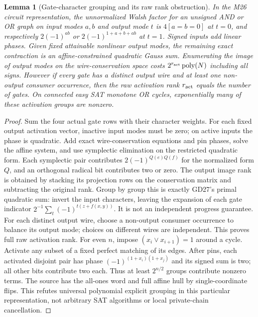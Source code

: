 \documentclass[11pt]{article}
\newtheorem{lemma}[theorem]{Lemma}
\begin{document}
\begin{lemma}[Gate-character grouping and its raw rank obstruction]\label{lem:i26-gates}
In the M26 circuit representation, the unnormalized Walsh factor for an unsigned AND or OR graph on input modes $a,b$ and output mode $t$ is $4[a=b=0]$ at $t=0$, and respectively $2(-1)^{ab}$ or $2(-1)^{1+a+b+ab}$ at $t=1$. Signed inputs add linear phases. Given fixed attainable nonlinear output modes, the remaining exact contraction is an affine-constrained quadratic Gauss sum. Enumerating the image of output modes on the wire-conservation space costs $2^{r_{\rm act}}\operatorname{poly}(N)$ including all signs. However if every gate has a distinct output wire and at least one non-output consumer occurrence, then the raw activation rank $r_{\rm act}$ equals the number of gates. On connected easy SAT monotone OR cycles, exponentially many of these activation groups are nonzero.
\end{lemma}
\begin{proof}
Sum the four actual gate rows with their character weights. For each fixed output activation vector, inactive input modes must be zero; on active inputs the phase is quadratic. Add exact wire-conservation equations and pin phases, solve the affine system, and use symplectic elimination on the restricted quadratic form. Each symplectic pair contributes $2(-1)^{Q(e)Q(f)}$ for the normalized form $Q$, and an orthogonal radical bit contributes two or zero. The output image rank is obtained by stacking its projection rows on the conservation matrix and subtracting the original rank. Group by group this is exactly GD27's primal quadratic sum: invert the input characters, leaving the expansion of each gate indicator $2^{-1}\sum_t(-1)^{t(z+f(x,y))}$. It is not an independent progress guarantee. For each distinct output wire, choose a non-output consumer occurrence to balance its output mode; choices on different wires are independent. This proves full raw activation rank. For even $n$, impose $(x_i\lor x_{i+1})=1$ around a cycle. Activate any subset of a fixed perfect matching of its edges. After pins, each activated disjoint pair has phase $(-1)^{(1+x_i)(1+x_j)}$ and its signed sum is two; all other bits contribute two each. Thus at least $2^{n/2}$ groups contribute nonzero terms. The source has the all-ones word and full affine hull by single-coordinate flips. This refutes universal polynomial explicit grouping in this particular representation, not arbitrary SAT algorithms or local private-chain cancellation.
\end{proof}
\end{document}
